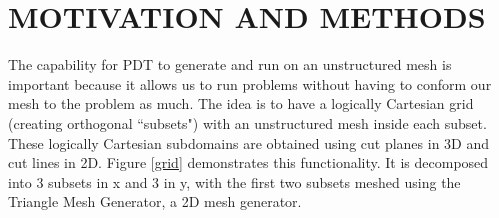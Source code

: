 
\chapter{\uppercase {Motivation and Methods}}
\label{ch:motivation}

The capability for PDT to generate and run on an unstructured mesh is important because it allows us to run problems without having to conform our mesh to the problem as much. The idea is to have a logically Cartesian grid (creating orthogonal ``subsets") with an unstructured mesh inside each subset. These logically Cartesian subdomains are obtained using cut planes in 3D and cut lines in 2D. Figure \ref{grid} demonstrates this functionality. It is decomposed into 3 subsets in x and 3 in y, with the first two subsets meshed using the Triangle Mesh Generator\cite{triangle}, a 2D mesh generator.

\bigskip

